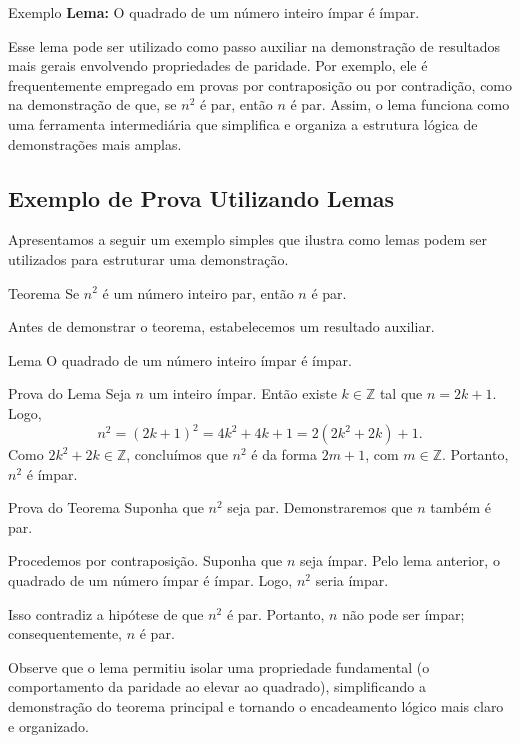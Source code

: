 \documentclass[12pt,a4paper,openright]{book}
\begin{document}
\begin{block}{Exemplo}
\textbf{Lema:} O quadrado de um número inteiro ímpar é ímpar.
\end{block}

Esse lema pode ser utilizado como passo auxiliar na demonstração de resultados mais gerais envolvendo propriedades de paridade. Por exemplo, ele é frequentemente empregado em provas por contraposição ou por contradição, como na demonstração de que, se \(n^2\) é par, então \(n\) é par. Assim, o lema funciona como uma ferramenta intermediária que simplifica e organiza a estrutura lógica de demonstrações mais amplas.
\subsection{Exemplo de Prova Utilizando Lemas}

Apresentamos a seguir um exemplo simples que ilustra como lemas podem ser utilizados para estruturar uma demonstração.

\begin{block}{Teorema}
Se \(n^2\) é um número inteiro par, então \(n\) é par.
\end{block}

Antes de demonstrar o teorema, estabelecemos um resultado auxiliar.

\begin{block}{Lema}
O quadrado de um número inteiro ímpar é ímpar.
\end{block}

\begin{block}{Prova do Lema}
Seja \(n\) um inteiro ímpar. Então existe \(k \in \mathbb{Z}\) tal que \(n = 2k + 1\). Logo,
\[
n^2 = (2k + 1)^2 = 4k^2 + 4k + 1 = 2(2k^2 + 2k) + 1.
\]
Como \(2k^2 + 2k \in \mathbb{Z}\), concluímos que \(n^2\) é da forma \(2m + 1\), com \(m \in \mathbb{Z}\). Portanto, \(n^2\) é ímpar.
\end{block}

\begin{block}{Prova do Teorema}
Suponha que \(n^2\) seja par. Demonstraremos que \(n\) também é par.

Procedemos por contraposição. Suponha que \(n\) seja ímpar. Pelo lema anterior, o quadrado de um número ímpar é ímpar. Logo, \(n^2\) seria ímpar.

Isso contradiz a hipótese de que \(n^2\) é par. Portanto, \(n\) não pode ser ímpar; consequentemente, \(n\) é par.
\end{block}

Observe que o lema permitiu isolar uma propriedade fundamental (o comportamento da paridade ao elevar ao quadrado), simplificando a demonstração do teorema principal e tornando o encadeamento lógico mais claro e organizado.
\end{document}
